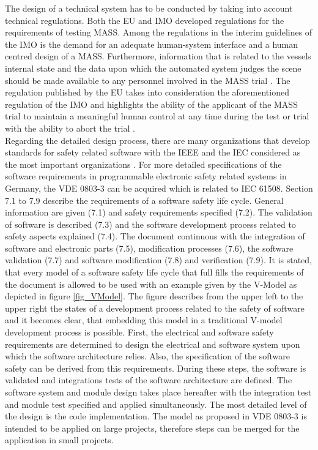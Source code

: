  The design of a technical system has to be conducted by taking into account technical regulations. Both the EU and \ac{IMO} developed regulations for the requirements of testing \ac{MASS}. Among the regulations in the interim guidelines of the \ac{IMO} is the demand for an adequate human-system interface and a human centred design of a \ac{MASS}. Furthermore, information that is related to the vessels internal state and the data upon which the automated system judges the scene should be made available to any personnel involved in the \ac{MASS} trial \cite{IMO_MASS}. The regulation published by the EU takes into consideration the aforementioned regulation of the \ac{IMO} and highlights the  ability of the applicant of the \ac{MASS} trial to maintain a meaningful human control at any time during the test or trial with the ability to abort the trial \cite{EU_MASS}.\\
 
 Regarding the detailed design process, there are many organizations that develop standards for safety related software with the \ac{IEEE} and the \ac{IEC} considered as the most important organizations \cite{OverviewReg}. For more detailed specifications of the software requirements in programmable electronic safety related systems in Germany, the \ac{VDE} 0803-3 \cite{DIN_3} can be acquired which is related to \ac{IEC} 61508. Section 7.1 to 7.9 describe the requirements of a software safety life cycle. General information are given (7.1) and safety requirements specified (7.2). The validation of software is described (7.3) and the software development process related to safety aspects explained (7.4). The document continuous with the integration of software and electronic parts (7.5), modification processes (7.6), the software validation (7.7) and software modification (7.8) and verification (7.9). It is stated, that every model of a software safety life cycle that full fills the requirements of the document is allowed to be used with an example given by the V-Model as depicted in figure \ref{fig_VModel}. The figure describes from the upper left to the upper right the states of a development process related to the safety of software and it becomes clear, that embedding this model in a traditional V-model development process is possible. First, the electrical and software safety requirements are determined to design the electrical and software system upon which the software architecture relies. Also, the specification of the software safety can be derived from this requirements. During these steps, the software is validated and integrations tests of the software architecture are defined. The software system and module design takes place hereafter with the integration test and module test specified and applied simultaneously. The most detailed level of the design is the code implementation. The model as proposed in \ac{VDE} 0803-3 is intended to be applied on large projects, therefore steps can be merged for the application in small projects.\\
 
